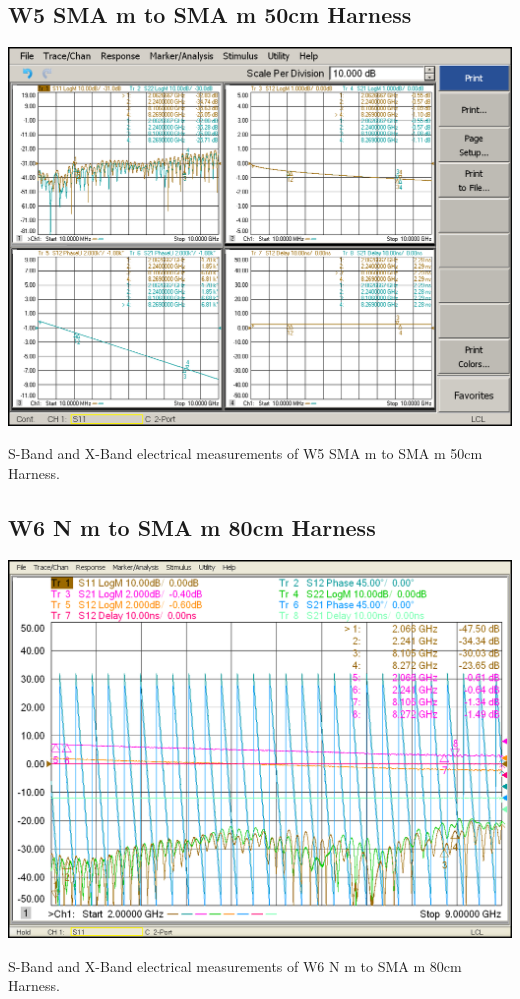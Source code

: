 \subsection{W5 SMA m to SMA m 50cm Harness}

\begin{table}[H]
	\centering
	\includegraphics[width=0.8\linewidth]{figuras/measures/W5_10M_10G}
	\caption{S-Band and X-Band electrical measurements of W5 SMA m to SMA m 50cm Harness.}
	\label{fig:W5}
\end{table}

\subsection{W6 N m to SMA m 80cm Harness}

\begin{table}[H]
	\centering
	\includegraphics[width=0.8\linewidth]{figuras/measures/W6_2G_9G}
	\caption{S-Band and X-Band electrical measurements of W6 N m to SMA m 80cm Harness.}
	\label{fig:W6}
\end{table}

